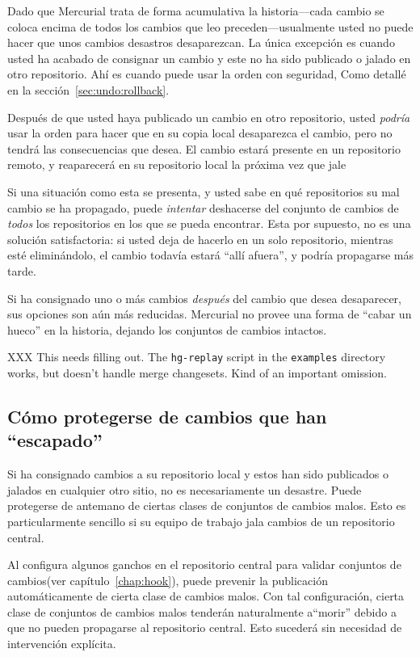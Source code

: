 Dado que Mercurial trata de forma acumulativa la historia---cada
cambio se coloca encima de todos los cambios que leo
preceden---usualmente usted no puede hacer que unos cambios desastros
desaparezcan. La única excepción es cuando usted ha acabado de
consignar un cambio y este no ha sido publicado o jalado en otro
repositorio. Ahí es cuando puede usar la orden  con
seguridad, Como detallé en la sección~\ref{sec:undo:rollback}.

Después de que usted haya publicado un cambio en otro repositorio, usted
\emph{podría} usar la orden  para hacer que en su copia
local desaparezca el cambio, pero no tendrá las consecuencias que
desea. El cambio estará presente en un repositorio remoto, y
reaparecerá en su repositorio local la próxima vez que jale

Si una situación como esta se presenta, y usted sabe en qué
repositorios su mal cambio se ha propagado, puede \emph{intentar}
deshacerse del conjunto de cambios de \emph{todos} los repositorios en
los que se pueda encontrar.  Esta por supuesto, no es una solución
satisfactoria: si usted deja de hacerlo en un solo repositorio,
mientras esté eliminándolo, el cambio todavía estará ``allí afuera'',
y podría propagarse más tarde.

Si ha consignado uno o más cambios \emph{después} del cambio que desea
desaparecer, sus opciones son aún más reducidas. Mercurial no provee
una forma de ``cabar un hueco'' en la historia, dejando los conjuntos
de cambios intactos.


XXX This needs filling out.  The \texttt{hg-replay} script in the
\texttt{examples} directory works, but doesn't handle merge
changesets.  Kind of an important omission.

\subsection{Cómo protegerse de cambios que han ``escapado''}

Si ha consignado cambios a su repositorio local y estos han sido
publicados o jalados en cualquier otro sitio, no es necesariamente un
desastre. Puede protegerse de antemano de ciertas clases de conjuntos
de cambios malos. Esto es particularmente sencillo si su equipo de
trabajo jala cambios de un repositorio central.

Al configura algunos ganchos en el repositorio central para validar
conjuntos de cambios(ver capítulo~\ref{chap:hook}), puede prevenir la
publicación automáticamente de cierta clase de cambios malos.  Con tal
configuración, cierta clase de conjuntos de cambios malos tenderán
naturalmente a``morir'' debido a que no pueden propagarse al
repositorio central.  Esto sucederá sin necesidad de intervención
explícita.

